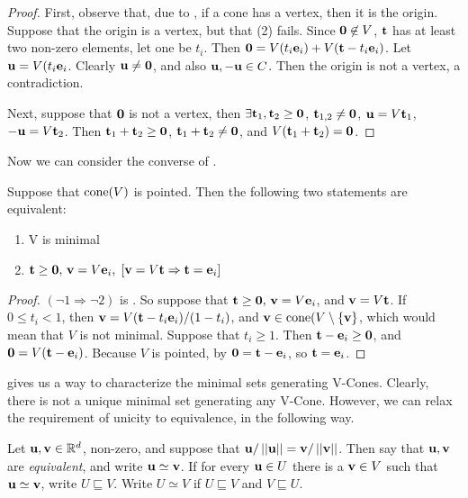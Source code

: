 \begin{proof}
	First, observe that, due to , if a cone has a vertex, then it is the origin.  Suppose that the origin is a vertex, but that (2) fails.  Since $\mathbf{0}\not\in V$, $\mathbf{t}$ has at least two non-zero elements, let one be $t_i$.  Then $\mathbf{0} = V(t_i\mathbf{e}_i) + V(\mathbf{t}-t_i\mathbf{e}_i)$.  Let $\mathbf{u}=V(t_i\mathbf{e}_i$.  Clearly $\mathbf{u}\neq\mathbf{0}$, and also $\mathbf{u},-\mathbf{u}\in C$.  Then the origin is not a vertex, a contradiction.

	Next, suppose that $\mathbf{0}$ is not a vertex, then $\exists\mathbf{t}_1,\mathbf{t}_2\geq\mathbf{0}$, $\mathbf{t}_{1,2}\neq\mathbf{0}$, $\mathbf{u}=V\mathbf{t}_1$, $-\mathbf{u}=V\mathbf{t}_2$.  Then $\mathbf{t}_1+\mathbf{t}_2\geq\mathbf{0}$, $\mathbf{t}_1+\mathbf{t}_2\neq\mathbf{0}$, and $V(\mathbf{t}_1+\mathbf{t}_2)=\mathbf{0}$.
\end{proof}

Now we can consider the converse of .

\begin{Prop}\label{min_vcone_generators}
	Suppose that $\operatorname{cone}(V)$ is pointed.  Then the following two statements are equivalent:
	\begin{enumerate}
		\item V is minimal
		\item $\mathbf{t}\geq\mathbf{0},\,\mathbf{v}=V\mathbf{e}_i,\; [\mathbf{v}=V\mathbf{t} \Rightarrow \mathbf{t}=\mathbf{e}_i]$
	\end{enumerate}
\end{Prop}

\begin{proof}
	$(\neg 1 \Rightarrow \neg 2)$ is .  So suppose that $\mathbf{t}\geq\mathbf{0},\,\mathbf{v}=V\mathbf{e}_i$, and $\mathbf{v}=V\mathbf{t}$.  If $0\leq t_i < 1$, then $\mathbf{v} = V(\mathbf{t}-t_i\mathbf{e}_i)/(1-t_i)$, and $\mathbf{v}\in \operatorname{cone}(V\setminus\{\mathbf{v}\} $, which would mean that $V$ is not minimal.  Suppose that $t_i\geq 1$.  Then $\mathbf{t}-\mathbf{e}_i\geq\mathbf{0}$, and $\mathbf{0}=V(\mathbf{t}-\mathbf{e}_i)$.  Because $V$ is pointed, by  $\mathbf{0}=\mathbf{t}-\mathbf{e}_i$, so $\mathbf{t}=\mathbf{e}_i$.
\end{proof}

 gives us a way to characterize the minimal sets generating V-Cones.  Clearly, there is not a unique minimal set generating any V-Cone.  However, we can relax the requirement of unicity to equivalence, in the following way.

\begin{Def}
	Let $\mathbf{u},\mathbf{v} \in \mathbb{R}^d$, non-zero, and suppose that $\mathbf{u}/\left|\left|\mathbf{u}\right|\right| = \mathbf{v}/\left|\left|\mathbf{v}\right|\right|$.  Then say that $\mathbf{u},\mathbf{v}$ are \textit{equivalent}, and write $\mathbf{u} \simeq \mathbf{v}$.  If for every $\mathbf{u}\in U$ there is a $\mathbf{v}\in V$ such that $\mathbf{u}\simeq\mathbf{v}$, write $ U \sqsubseteq V$.  Write $U \simeq V$ if $U \sqsubseteq V$ and $V \sqsubseteq U$.
\end{Def}


